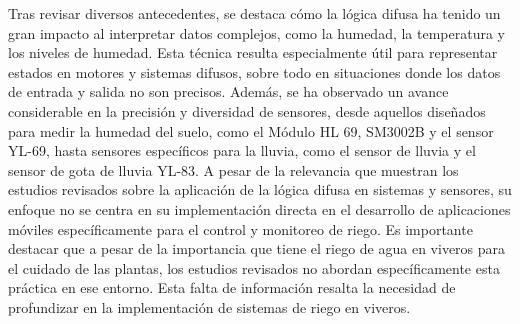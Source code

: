 \bigbreak
Tras revisar diversos antecedentes, se destaca cómo la lógica difusa ha tenido un gran impacto al interpretar datos complejos, como la humedad, la temperatura y los niveles de humedad. Esta técnica resulta especialmente útil para representar estados en motores y sistemas difusos, sobre todo en situaciones donde los datos de entrada y salida no son precisos. Además, se ha observado un avance considerable en la precisión y diversidad de sensores, desde aquellos diseñados para medir la humedad del suelo, como el Módulo HL 69, SM3002B y el sensor YL-69, hasta sensores específicos para la lluvia, como el sensor de lluvia y el sensor de gota de lluvia YL-83.
\bigbreak
A pesar de la relevancia que muestran los estudios revisados sobre la aplicación de la lógica difusa en sistemas y sensores, su enfoque no se centra en su implementación directa en el desarrollo de aplicaciones móviles específicamente para el control y monitoreo de riego. Es importante destacar que a pesar de la importancia que tiene el riego de agua en viveros para el cuidado de las plantas, los estudios revisados no abordan específicamente esta práctica en ese entorno. Esta falta de información resalta la necesidad de profundizar en la implementación de sistemas de riego en viveros.
